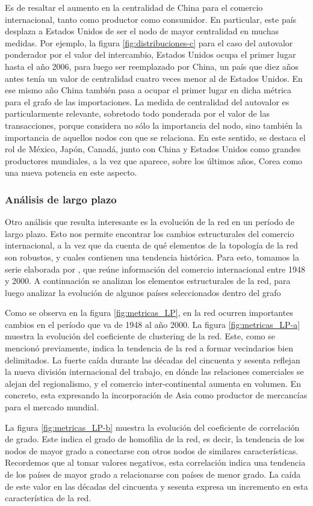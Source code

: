 \documentclass[class=article, crop=false]{standalone}
\begin{document}
Es de resaltar el aumento en la centralidad de China para el comercio internacional, tanto como productor como consumidor. En particular, este país desplaza a Estados Unidos de ser el nodo de mayor centralidad en muchas medidas. Por ejemplo, la figura \ref{fig:distribuciones-c} para el caso del autovalor ponderador por el valor del intercambio, Estados Unidos ocupa el primer lugar hasta el año 2006, para luego ser reemplazado por China, un país que diez años antes tenía un valor de centralidad cuatro veces menor al de Estados Unidos. En ese mismo año China también pasa a ocupar el primer lugar en dicha métrica para el grafo de las importaciones. La medida de centralidad del autovalor es particularmente relevante, sobretodo todo ponderada por el valor de las transacciones, porque considera no sólo la importancia del nodo, sino también la importancia de aquellos nodos con que se relaciona. En este sentido, se destaca el rol de México, Japón, Canadá, junto con China y Estados Unidos como grandes productores mundiales, a la vez que aparece, sobre los últimos años, Corea como una nueva potencia en este aspecto.  

\subsubsection{Análisis de largo plazo}

Otro análisis que resulta interesante es la evolución de la red en un período de largo plazo. Esto nos permite encontrar los cambios estructurales del comercio internacional, a la vez que da cuenta de qué elementos de la topología de la red son robustos, y cuales contienen una tendencia histórica. 
Para esto, tomamos la serie elaborada por \cite{Gleditsch2002}, que reúne información del comercio internacional entre 1948 y 2000. 
A continuación se analizan los elementos estructurales de la red, para luego analizar la evolución de algunos países seleccionados dentro del grafo

Como se observa en la figura \ref{fig:metricas_LP}, en la red ocurren importantes cambios en el período que va de 1948 al año 2000. 
La figura \ref{fig:metricas_LP-a} muestra la evolución del coeficiente de clustering de la red. Este, como se mencionó previamente, indica la tendencia de la red a formar vecindarios bien delimitados. La fuerte caída durante las décadas del cincuenta y sesenta reflejan la nueva división internacional del trabajo, en dónde las relaciones comerciales se alejan del regionalismo, y el comercio inter-continental aumenta en volumen. En concreto, esta expresando la incorporación de Asia como productor de mercancías para el mercado mundial. 
\par
La figura \ref{fig:metricas_LP-b} muestra la evolución del coeficiente de correlación de grado. Este indica el grado de homofilia de la red, es decir, la tendencia de los nodos de mayor grado a conectarse con otros nodos de similares características. Recordemos que al tomar valores negativos, esta correlación indica una tendencia de los países de mayor grado a relacionarse con países de menor grado. La caída de este valor en las décadas del cincuenta y sesenta expresa un incremento en esta característica de la red.  
\end{document}
